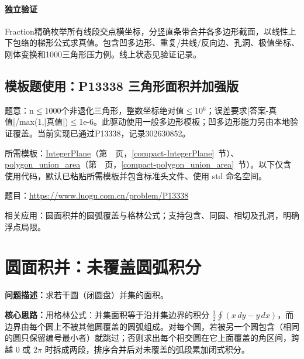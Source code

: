\paragraph{独立验证} Fraction精确枚举所有线段交点横坐标，分竖直条带合并各多边形截面，以线性上下包络的梯形公式求真值。包含凹多边形、重复/共线/反向边、孔洞、极值坐标、刚体变换和1000三角形压力例。线上状态见验证记录。

\newpage

\Needspace{297pt}

\subsection*{模板题使用：P13338 三角形面积并加强版}

\label{usage-example-399}

题意：n$\le$1000个非退化三角形，整数坐标绝对值$\le$10$^{6}$；误差要求|答案-真值|/max(1,|真值|)$\le$1e-6。此驱动使用一般多边形模板；凹多边形能力另由本地验证覆盖。当前实现已通过P13338，记录302630852。

所需模板：\hyperref[compact-IntegerPlane]{IntegerPlane}（第~\pageref{compact-IntegerPlane}~页，\ref{compact-IntegerPlane}~节）、\hyperref[compact-polygon_union_area]{polygon\_\allowbreak{}union\_\allowbreak{}area}（第~\pageref{compact-polygon_union_area}~页，\ref{compact-polygon_union_area}~节）。以下仅含使用代码，默认已粘贴所需模板并包含标准头文件、使用 std 命名空间。

题目：\url{https://www.luogu.com.cn/problem/P13338}



\newpage

\noindent 相关应用：圆面积并的圆弧覆盖与格林公式；支持包含、同圆、相切及孔洞，明确浮点局限。

\section{圆面积并：未覆盖圆弧积分}\label{compact-circle_union_area}

\noindent\textbf{问题描述：}\allowbreak 求若干圆（闭圆盘）并集的面积。

\textbf{核心思路：}\allowbreak 用格林公式：并集面积等于沿并集边界的积分 $\frac12\oint(x\,dy-y\,dx)$，而边界由每个圆上不被其他圆覆盖的圆弧组成。对每个圆，若被另一个圆包含（相同的圆只保留编号最小者）就跳过；否则求出每个相交圆在它上面覆盖的角区间，跨越 $0$ 或 $2\pi$ 时拆成两段，排序合并后对未覆盖的弧段累加闭式积分。

